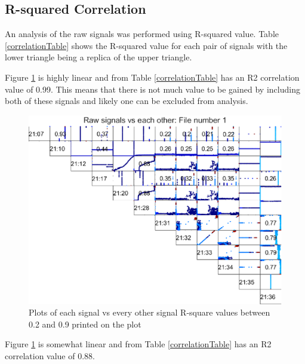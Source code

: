 \documentclass{article}
\begin{document}
\subsection{R-squared Correlation}
An analysis of the raw signals was performed using R-squared value. Table \ref{correlationTable} shows the R-squared value for each pair of signals with the lower triangle being a replica of the upper triangle. 
\begin{center}
    
\label{correlationTable}
\end{center}
Figure \ref{fig:RawSignalCorrelationsFile1} is highly linear and from Table \ref{correlationTable} has an R2 correlation value of 0.99. This means that there is not much value to be gained by including both of these signals and likely one can be excluded from analysis.
\begin{figure}[H]
    \centering
    \includegraphics[width=\textwidth, height=\textheight, keepaspectratio]{figures/RawSignalCorrelationsFile1.eps}
    \caption{Plots of each signal vs every other signal R-square values between 0.2 and 0.9 printed on the plot}
    \label{fig:RawSignalCorrelationsFile1}
\end{figure}
Figure \ref{fig:RawSignalCorrelationsFile1} is somewhat linear and from Table \ref{correlationTable} has an R2 correlation value of 0.88.
\end{document}
